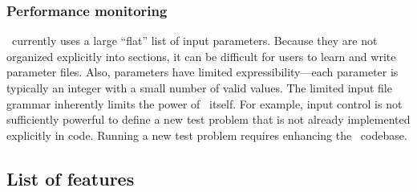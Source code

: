 \documentclass[11pt]{article}
\begin{document}
%


    \subsubsection{Performance monitoring}  
%




% 
    \enzo\ currently uses a large ``flat'' list of input parameters.
    Because they are not organized explicitly into sections, it can be
    difficult for users to learn and write parameter files.
%
    Also, parameters have limited expressibility---each parameter is
    typically an integer with a small number of valid values.
%
    The limited input file grammar inherently limits the power of
    \enzo\ itself.  For example, input control is not sufficiently
    powerful to define a new test problem that is not already
    implemented explicitly in code.  Running a new test problem
    requires enhancing the \enzo\ codebase.


\subsection{List of features}

\end{document}
